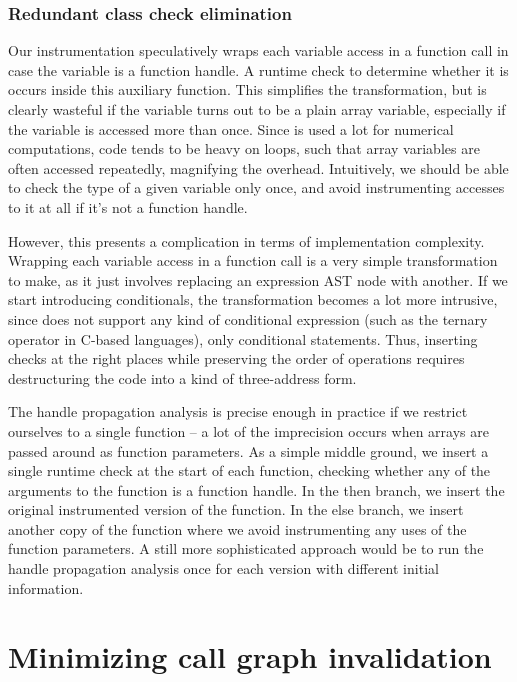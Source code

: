 \subsubsection{Redundant class check elimination}

Our instrumentation speculatively wraps each variable access in a function call
in case the variable is a function handle. A runtime check to determine whether
it is occurs inside this auxiliary function. This simplifies the
transformation, but is clearly wasteful if the variable turns out to be a plain
array variable, especially if the variable is accessed more than once. Since
\matlab is used a lot for numerical computations, \matlab code tends to be
heavy on loops, such that array variables are often accessed repeatedly,
magnifying the overhead. Intuitively, we should be able to check the type of a
given variable only once, and avoid instrumenting accesses to it at all if it's
not a function handle.

However, this presents a complication in terms of implementation complexity.
Wrapping each variable access in a function call is a very simple
transformation to make, as it just involves replacing an expression AST node
with another. If we start introducing conditionals, the transformation becomes
a lot more intrusive, since \matlab does not support any kind of conditional
expression (such as the ternary \code{\?:} operator in C-based languages), only
conditional statements. Thus, inserting checks at the right places while
preserving the order of operations requires destructuring the code into a kind
of three-address form.

The handle propagation analysis is precise enough in practice if we restrict
ourselves to a single function -- a lot of the imprecision occurs when arrays
are passed around as function parameters. As a simple middle ground, we insert
a single runtime check at the start of each function, checking whether any of
the arguments to the function is a function handle. In the then branch, we
insert the original instrumented version of the function. In the else branch,
we insert another copy of the function where we avoid instrumenting any uses of
the function parameters. A still more sophisticated approach would be to run
the handle propagation analysis once for each version with different initial
information.

\section{Minimizing call graph invalidation}

